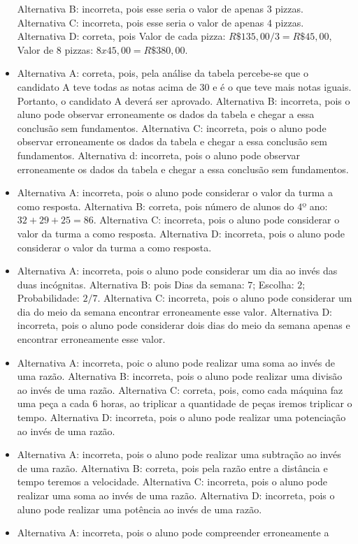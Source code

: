 \begin{itemize}
Alternativa B: incorreta, pois esse seria o valor de apenas $3$ pizzas.
Alternativa C: incorreta, pois esse seria o valor de apenas $4$ pizzas.
Alternativa D: correta, pois Valor de cada pizza: $R\$135,00/3 = R\$
45,00$, Valor de $8$ pizzas: $8 x 45,00 = R\$380,00$.
\item Alternativa A: correta, pois, pela análise da tabela percebe-se que o
candidato A teve todas as notas acima de $30$ e é o que teve mais notas
iguais. Portanto, o candidato A deverá ser aprovado.
Alternativa B: incorreta, pois o aluno pode observar erroneamente os
dados da tabela e chegar a essa conclusão sem fundamentos.
Alternativa C: incorreta, pois o aluno pode observar erroneamente os
dados da tabela e chegar a essa conclusão sem fundamentos.
Alternativa d: incorreta, pois o aluno pode observar erroneamente os
dados da tabela e chegar a essa conclusão sem fundamentos.
\item Alternativa A: incorreta, pois o aluno pode considerar o valor da turma
a como resposta.
Alternativa B: correta, pois número de alunos do $4$º ano: $32 + 29 + 25 = 86$.
Alternativa C: incorreta, pois o aluno pode considerar o valor da turma
a como resposta.
Alternativa D: incorreta, pois o aluno pode considerar o valor da turma
a como resposta.
\item Alternativa A: incorreta, pois o aluno pode considerar um dia ao invés
das duas incógnitas.
Alternativa B: pois Dias da semana: $7$; Escolha: $2$; Probabilidade: $2/7$.
Alternativa C: incorreta, pois o aluno pode considerar um dia do meio da
semana encontrar erroneamente esse valor.
Alternativa D: incorreta, pois o aluno pode considerar dois dias do meio
da semana apenas e encontrar erroneamente esse valor.
\item Alternativa A: incorreta, poic o aluno pode realizar uma soma ao invés
de uma razão.
Alternativa B: incorreta, pois o aluno pode realizar uma divisão ao
invés de uma razão.
Alternativa C: correta, pois, como cada máquina faz uma peça a cada $6$
horas, ao triplicar a quantidade de peças iremos triplicar o tempo.
Alternativa D: incorreta, pois o aluno pode realizar uma potenciação ao
invés de uma razão.
\item Alternativa A: incorreta, pois o aluno pode realizar uma subtração ao
invés de uma razão.
Alternativa B: correta, pois pela razão entre a distância e tempo
teremos a velocidade.
Alternativa C: incorreta, pois o aluno pode realizar uma soma ao invés
de uma razão.
Alternativa D: incorreta, pois o aluno pode realizar uma potência ao
invés de uma razão.
\item Alternativa A: incorreta, pois o aluno pode compreender erroneamente a

\end{itemize}
